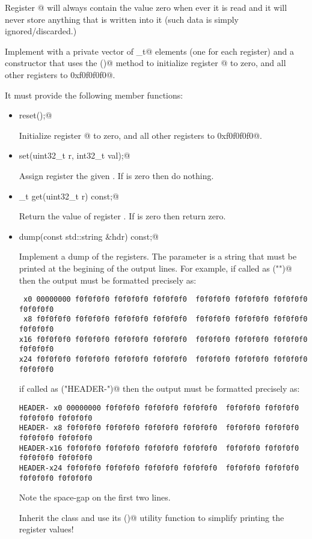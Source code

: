 \documentclass{article}
\begin{document}
Register @ will always contain the value zero when ever it is
read and it will never store anything that is written into it (such
data is simply ignored/discarded.)

Implement \verb@registerfile@ with a private vector of 
_t@ elements (one for each register) and a constructor that 
uses the \verb@reset()@ method to initialize register @ to zero, 
and all other registers to \verb@0xf0f0f0f0@.

It must provide the following member functions:

\begin{itemize}
\item \verb@void reset();@

Initialize register @ to zero, and all other registers to \verb@0xf0f0f0f0@.

\item \verb@void set(uint32_t r, int32_t val);@

Assign register \verb@r@ the given \verb@val@.  
If \verb@r@ is zero then do nothing.

\item {}_t get(uint32_t r) const;@

Return the value of register \verb@r@.
If \verb@r@ is zero then return zero.

\item \verb@void dump(const std::string &hdr) const;@

Implement a dump of the registers.  The \verb@hdr@ parameter is a string that
must be printed at the begining of the output lines.  For example, if called 
as \verb@dump("")@ then the output must be formatted precisely as:
{\small
\begin{verbatim}
 x0 00000000 f0f0f0f0 f0f0f0f0 f0f0f0f0  f0f0f0f0 f0f0f0f0 f0f0f0f0 f0f0f0f0
 x8 f0f0f0f0 f0f0f0f0 f0f0f0f0 f0f0f0f0  f0f0f0f0 f0f0f0f0 f0f0f0f0 f0f0f0f0
x16 f0f0f0f0 f0f0f0f0 f0f0f0f0 f0f0f0f0  f0f0f0f0 f0f0f0f0 f0f0f0f0 f0f0f0f0
x24 f0f0f0f0 f0f0f0f0 f0f0f0f0 f0f0f0f0  f0f0f0f0 f0f0f0f0 f0f0f0f0 f0f0f0f0
\end{verbatim}
}

if called as \verb@dump("HEADER-")@ then the output must be formatted precisely as:
{\small
\begin{verbatim}
HEADER- x0 00000000 f0f0f0f0 f0f0f0f0 f0f0f0f0  f0f0f0f0 f0f0f0f0 f0f0f0f0 f0f0f0f0
HEADER- x8 f0f0f0f0 f0f0f0f0 f0f0f0f0 f0f0f0f0  f0f0f0f0 f0f0f0f0 f0f0f0f0 f0f0f0f0
HEADER-x16 f0f0f0f0 f0f0f0f0 f0f0f0f0 f0f0f0f0  f0f0f0f0 f0f0f0f0 f0f0f0f0 f0f0f0f0
HEADER-x24 f0f0f0f0 f0f0f0f0 f0f0f0f0 f0f0f0f0  f0f0f0f0 f0f0f0f0 f0f0f0f0 f0f0f0f0
\end{verbatim}
}

Note the space-gap  on the first two lines.

Inherit the \verb@hex@ class and use its ()@ utility function to simplify printing 
the register values!

\end{itemize}
\end{document}
